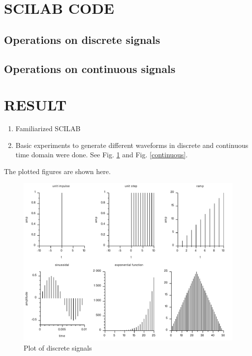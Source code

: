 \section*{SCILAB CODE}
\subsection*{Operations on discrete signals}




\subsection*{Operations on continuous signals}


\section*{RESULT}

\begin{enumerate}
\item
Familiarized SCILAB
\item
Basic experiments to generate different waveforms in discrete and continuous time domain were done. See Fig. \ref{discrete} and Fig. \ref{continuous}.
\end{enumerate}

The plotted figures are shown here.

\begin{figure}
\includegraphics[scale=.5]{scilabCode/discrete.pdf}
\caption{Plot of discrete signals}
\label{discrete}
\end{figure}

